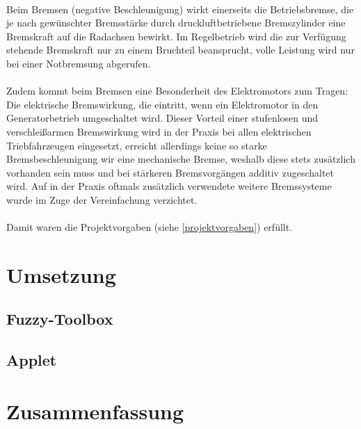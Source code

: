 \documentclass[10pt,a4paper]{article}
\begin{document}
\paragraph{}
Beim Bremsen (negative Beschleunigung) wirkt einerseits die Betriebsbremse, die je nach gewünschter Bremsstärke durch druckluftbetriebene Bremszylinder eine Bremskraft auf die Radachsen bewirkt. Im Regelbetrieb wird die zur Verfügung stehende Bremskraft nur zu einem Bruchteil beansprucht, volle Leistung wird nur bei einer Notbremsung abgerufen.
\paragraph{}
Zudem kommt beim Bremsen eine Besonderheit des Elektromotors zum Tragen: Die elektrische Bremswirkung, die eintritt, wenn ein Elektromotor in den Generatorbetrieb umgeschaltet wird. Dieser Vorteil einer stufenlosen und verschleißarmen Bremswirkung wird in der Praxis bei allen elektrischen Triebfahrzeugen eingesetzt, erreicht allerdings keine so starke Bremsbeschleunigung wir eine mechanische Bremse, weshalb diese stets zusätzlich vorhanden sein muss und bei stärkeren Bremsvorgängen additiv zugeschaltet wird.
Auf in der Praxis oftmals zusätzlich verwendete weitere Bremssysteme wurde im Zuge der Vereinfachung verzichtet.

\paragraph{}
Damit waren die Projektvorgaben (siehe \ref{projektvorgaben}) erfüllt.

\section{Umsetzung}

\subsection{Fuzzy-Toolbox}

\subsection{Applet}

\section{Zusammenfassung}
\end{document}
